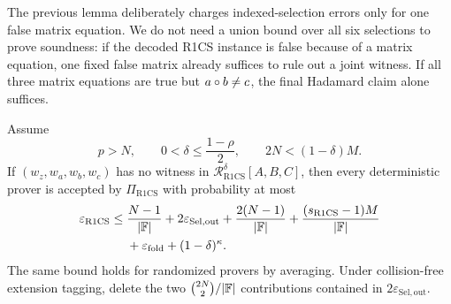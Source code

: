 The previous lemma deliberately charges indexed-selection errors only for one false matrix equation.  We do not need a union bound over all six selections to prove soundness: if the decoded R1CS instance is false because of a matrix equation, one fixed false matrix already suffices to rule out a joint witness.  If all three matrix equations are true but $a\circ b\ne c$, the final Hadamard claim alone suffices.

\begin{theorem}
\label{thm:r1cs-soundness}
Assume
\begin{equation}
  p>N,
  \qquad
  0<\delta\le\frac{1-\rho}{2},
  \qquad
  2N<(1-\delta)M.
  \label{eq:r1cs-parameters}
\end{equation}
If $(w_z,w_a,w_b,w_c)$ has no witness in $\mathcal R^{\delta}_{\mathrm{R1CS}}[A,B,C]$, then every deterministic prover is accepted by $\Pi_{\mathrm{R1CS}}$ with probability at most
\begin{equation}
\begin{split}
  \varepsilon_{\mathrm{R1CS}}
  \le{}&
  \frac{N-1}{|\mathbb{F}|}
  +2\varepsilon_{\mathrm{Sel,out}}
  +\frac{2(N-1)}{|\mathbb{F}|}
  +\frac{(s_{\mathrm{R1CS}}-1)M}{|\mathbb{F}|}
  \\
  &+\varepsilon_{\mathrm{fold}}
  +(1-\delta)^\kappa.
\end{split}
\label{eq:r1cs-soundness-bound}
\end{equation}
The same bound holds for randomized provers by averaging.  Under collision-free extension tagging, delete the two $\binom{2N}{2}/|\mathbb{F}|$ contributions contained in $2\varepsilon_{\mathrm{Sel,out}}$.
\end{theorem}

